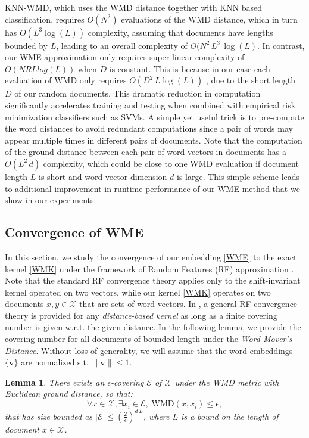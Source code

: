 \documentclass[11pt,a4paper]{article}
\newtheorem{lemma}{Lemma}
\newcommand{\X}{\mathcal{X}}
\newcommand{\1}{\boldsymbol{1}}
\newcommand{\bv}{\boldsymbol{v}}
\newcommand{\WMD}{\text{WMD}}
\newcommand{\E}{\mathcal{E}}
\begin{document}
KNN-WMD, which uses the WMD distance together with KNN based classification, requires $O(N^2)$ evaluations of the WMD distance, which in turn has $O(L^3 \log(L))$ complexity, assuming that documents have lengths bounded by $L$, leading to an overall complexity of $O(N^2 \,L^3\, \log(L)$. In contrast, our WME approximation only requires super-linear complexity of $O(NRLlog(L))$ when $D$ is constant. This is because in our case each evaluation of WMD only requires $O(D^2 \, L \log(L))$ \cite{bourgeois1971extension}, due to the short length $D$ of our random documents. This dramatic reduction in computation significantly accelerates training and testing when combined with empirical risk minimization classifiers such as SVMs. A simple yet useful trick is to pre-compute the word distances to avoid redundant computations since a pair of words may appear multiple times in different pairs of documents. Note that the computation of the ground distance between each pair of word vectors in documents has a $O(L^2\,d)$ complexity, which could be close to one WMD evaluation if document length $L$ is short and word vector dimension $d$ is large. This simple scheme leads to additional improvement in runtime performance of our WME method that we show in our experiments.

\subsection{Convergence of WME}

In this section, we study the convergence of our embedding \eqref{WME} to the exact kernel \eqref{WMK} under the framework of Random Features (RF) approximation \cite{rahimi2007random}. Note that the standard RF convergence theory applies only to the shift-invariant kernel operated on two vectors, while our kernel \eqref{WMK} operates on two documents $x,y\in\X$ that are sets of word vectors. In \cite{wu2018d2ke}, a general RF convergence theory is provided for any \emph{distance-based kernel} as long as a finite covering number is given w.r.t. the given distance. In the following lemma, we provide the covering number for all documents of bounded length under the \emph{Word Mover's Distance}. Without loss of generality, we will assume that the word embeddings $\{\bv\}$ are normalized s.t. $\|\bv\|\leq 1$.

\begin{lemma} \label{lemma:convergence}
There exists an $\epsilon$-covering $\E$ of $\X$ under the WMD metric with Euclidean ground distance, so that:
$$
\forall x\in\X, \exists x_i\in \E,\;\WMD(x,x_i)\leq \epsilon,
$$
that has size bounded as $|\E| \leq (\frac{2}{\epsilon})^{d\,L}$, where $L$ is a bound on the length of document $x\in\X$.
\end{lemma}
\end{document}
